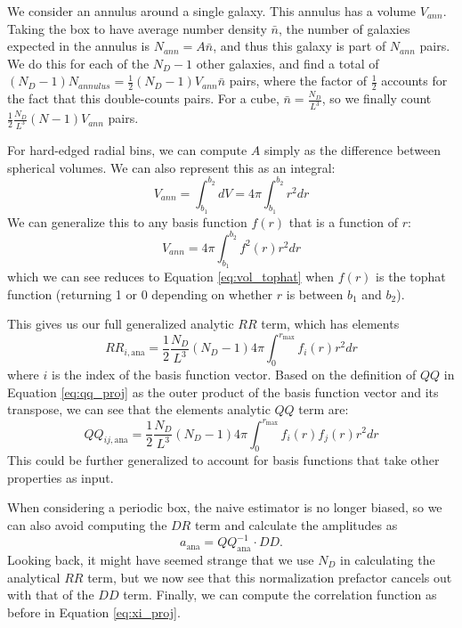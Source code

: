 \documentclass[modern]{aastex62}
\newcommand{\inv}{^{-1}}
\begin{document}
We consider an annulus around a single galaxy. 
This annulus has a volume $V_{ann}$.
Taking the box to have average number density $\bar{n}$, the number of galaxies expected in the annulus is $N_{ann} = A \bar{n}$, and thus this galaxy is part of $N_{ann}$ pairs.   
We do this for each of the $N_D-1$ other galaxies, and find a total of $(N_D-1) N_{annulus} = \frac{1}{2} (N_D-1) V_{ann} \bar{n}$ pairs, where the factor of $\frac{1}{2}$ accounts for the fact that this double-counts pairs.
For a cube, $\bar{n} = \frac{N_D}{L^3}$, so we finally count $\frac{1}{2} \frac{N_D}{L^3} (N-1) V_{ann}$ pairs.

For hard-edged radial bins, we can compute $A$ simply as the difference between spherical volumes. 
We can also represent this as an integral:
\begin{equation} \label{eq:vol_tophat}
V_{ann} = \int_{b_1}^{b_2} dV = 4\pi \int_{b_1}^{b_2} r^2 dr
\end{equation} 
We can generalize this to any basis function $f(r)$ that is a function of $r$:
\begin{equation}
V_{ann} = 4\pi  \int_{b_1}^{b_2} f^2(r) r^2 dr
\end{equation}
which we can see reduces to Equation \ref{eq:vol_tophat} when $f(r)$ is the tophat function (returning 1 or 0 depending on whether $r$ is between $b_1$ and $b_2$).

This gives us our full generalized analytic $RR$ term, which has elements
\begin{equation}
RR_{i,\text{ana}} = \frac{1}{2} \frac{N_D}{L^3} (N_D-1)  4\pi  \int_{0}^{r_\mathrm{max}} f_i(r) r^2 dr
\end{equation}
where $i$ is the index of the basis function vector.
Based on the definition of $QQ$ in Equation \ref{eq:qq_proj} as the outer product of the basis function vector and its transpose, we can see that the elements analytic $QQ$ term are:
\begin{equation}
QQ_{ij,\text{ana}} = \frac{1}{2} \frac{N_D}{L^3} (N_D-1)  4\pi  \int_{0}^{r_\mathrm{max}} f_i(r) f_j(r) r^2 dr
\end{equation}
This could be further generalized to account for basis functions that take other properties as input.

When considering a periodic box, the naive estimator is no longer biased, so we can also avoid computing the $DR$ term and calculate the amplitudes as 
\begin{equation}
a_{\mathrm{ana}} = QQ_\mathrm{ana} \inv \cdot DD.
\end{equation}
Looking back, it might have seemed strange that we use $N_D$ in calculating the analytical $RR$ term, but we now see that this normalization prefactor cancels out with that of the $DD$ term.
Finally, we can compute the correlation function as before in Equation \ref{eq:xi_proj}.
\end{document}
